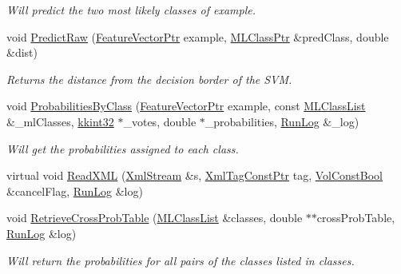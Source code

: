 \begin{DoxyCompactItemize}
\begin{DoxyCompactList}\small\item\em Will predict the two most likely classes of \textquotesingle{}example\textquotesingle{}. \end{DoxyCompactList}\item 
void \hyperlink{class_k_k_m_l_l_1_1_s_v_m_model_a0d323e778b6be3b2fdfe95e8c9123645}{Predict\+Raw} (\hyperlink{namespace_k_k_m_l_l_a0c5df3d48f45926fbc4fee04f5e3bc04}{Feature\+Vector\+Ptr} example, \hyperlink{namespace_k_k_m_l_l_ac272393853d59e72e8456f14cd6d8c23}{M\+L\+Class\+Ptr} \&pred\+Class, double \&dist)
\begin{DoxyCompactList}\small\item\em Returns the distance from the decision border of the S\+VM. \end{DoxyCompactList}\item 
void \hyperlink{class_k_k_m_l_l_1_1_s_v_m_model_a1c5a892328e992f604e129d6d3f6bdca}{Probabilities\+By\+Class} (\hyperlink{namespace_k_k_m_l_l_a0c5df3d48f45926fbc4fee04f5e3bc04}{Feature\+Vector\+Ptr} example, const \hyperlink{class_k_k_m_l_l_1_1_m_l_class_list}{M\+L\+Class\+List} \&\+\_\+ml\+Classes, \hyperlink{namespace_k_k_b_a8fa4952cc84fda1de4bec1fbdd8d5b1b}{kkint32} $\ast$\+\_\+votes, double $\ast$\+\_\+probabilities, \hyperlink{class_k_k_b_1_1_run_log}{Run\+Log} \&\+\_\+log)
\begin{DoxyCompactList}\small\item\em Will get the probabilities assigned to each class. \end{DoxyCompactList}\item 
virtual void \hyperlink{class_k_k_m_l_l_1_1_s_v_m_model_ad98423dac9fe89cde21ca69082c2d640}{Read\+X\+ML} (\hyperlink{class_k_k_b_1_1_xml_stream}{Xml\+Stream} \&s, \hyperlink{namespace_k_k_b_a5f1b0b1667d79fec26deeff10c43df23}{Xml\+Tag\+Const\+Ptr} tag, \hyperlink{namespace_k_k_b_a7d390f568e2831fb76b86b56c87bf92f}{Vol\+Const\+Bool} \&cancel\+Flag, \hyperlink{class_k_k_b_1_1_run_log}{Run\+Log} \&log)
\item 
void \hyperlink{class_k_k_m_l_l_1_1_s_v_m_model_a05b5f25f66cdb59e35655b73a00679e6}{Retrieve\+Cross\+Prob\+Table} (\hyperlink{class_k_k_m_l_l_1_1_m_l_class_list}{M\+L\+Class\+List} \&classes, double $\ast$$\ast$cross\+Prob\+Table, \hyperlink{class_k_k_b_1_1_run_log}{Run\+Log} \&log)
\begin{DoxyCompactList}\small\item\em Will return the probabilities for all pairs of the classes listed in \textquotesingle{}classes\textquotesingle{}. \end{DoxyCompactList}\item 
$$
\end{DoxyCompactItemize}
